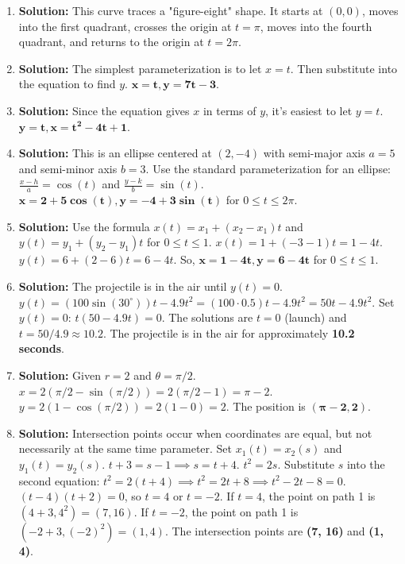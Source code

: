 \documentclass{article}
\begin{document}
\begin{enumerate}
\item \textbf{Solution:} This curve traces a "figure-eight" shape. It starts at $(0,0)$, moves into the first quadrant, crosses the origin at $t=\pi$, moves into the fourth quadrant, and returns to the origin at $t=2\pi$.

\item \textbf{Solution:} The simplest parameterization is to let $x=t$. Then substitute into the equation to find $y$.
$\mathbf{x=t, y=7t-3}$.

\item \textbf{Solution:} Since the equation gives $x$ in terms of $y$, it's easiest to let $y=t$.
$\mathbf{y=t, x=t^2 - 4t + 1}$.

\item \textbf{Solution:} This is an ellipse centered at $(2, -4)$ with semi-major axis $a=5$ and semi-minor axis $b=3$.
Use the standard parameterization for an ellipse:
$\frac{x-h}{a} = \cos(t)$ and $\frac{y-k}{b} = \sin(t)$.
$\mathbf{x = 2 + 5\cos(t), y = -4 + 3\sin(t)}$ for $0 \le t \le 2\pi$.

\item \textbf{Solution:} Use the formula $x(t) = x_1 + (x_2-x_1)t$ and $y(t) = y_1 + (y_2-y_1)t$ for $0 \le t \le 1$.
$x(t) = 1 + (-3-1)t = 1 - 4t$.
$y(t) = 6 + (2-6)t = 6 - 4t$.
So, $\mathbf{x=1-4t, y=6-4t}$ for $0 \le t \le 1$.

\item \textbf{Solution:} The projectile is in the air until $y(t) = 0$.
$y(t) = (100\sin(30^\circ))t - 4.9t^2 = (100 \cdot 0.5)t - 4.9t^2 = 50t - 4.9t^2$.
Set $y(t) = 0$: $t(50 - 4.9t) = 0$.
The solutions are $t=0$ (launch) and $t = 50/4.9 \approx 10.2$.
The projectile is in the air for approximately \textbf{10.2 seconds}.

\item \textbf{Solution:} Given $r=2$ and $\theta=\pi/2$.
$x = 2(\pi/2 - \sin(\pi/2)) = 2(\pi/2 - 1) = \pi - 2$.
$y = 2(1 - \cos(\pi/2)) = 2(1 - 0) = 2$.
The position is $\mathbf{(\pi-2, 2)}$.

\item \textbf{Solution:} Intersection points occur when coordinates are equal, but not necessarily at the same time parameter.
Set $x_1(t) = x_2(s)$ and $y_1(t) = y_2(s)$.
$t+3 = s-1 \implies s = t+4$.
$t^2 = 2s$.
Substitute $s$ into the second equation: $t^2 = 2(t+4) \implies t^2 = 2t+8 \implies t^2 - 2t - 8 = 0$.
$(t-4)(t+2) = 0$, so $t=4$ or $t=-2$.
If $t=4$, the point on path 1 is $(4+3, 4^2) = (7, 16)$.
If $t=-2$, the point on path 1 is $(-2+3, (-2)^2) = (1, 4)$.
The intersection points are \textbf{(7, 16)} and \textbf{(1, 4)}.


\end{enumerate}
\end{document}
